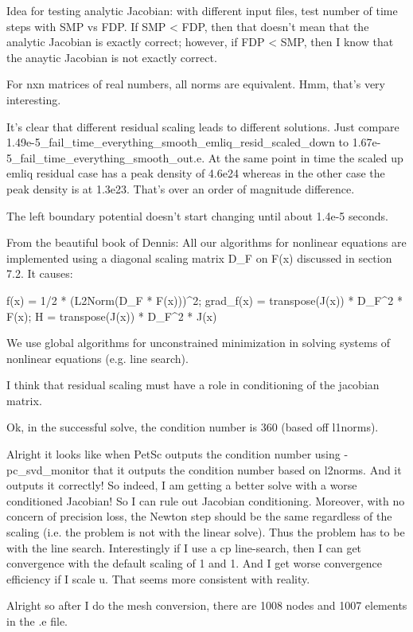 {Idea for testing analytic Jacobian: with different input files, test number of time steps with SMP vs FDP. If SMP < FDP, then that doesn't mean that the analytic Jacobian is exactly correct; however, if FDP < SMP, then I know that the anaytic Jacobian is not exactly correct.

For nxn matrices of real numbers, all norms are equivalent. Hmm, that's very interesting.

It's clear that different residual scaling leads to different solutions. Just compare 1.49e-5_fail_time_everything_smooth_emliq_resid_scaled_down to 1.67e-5_fail_time_everything_smooth_out.e. At the same point in time the scaled up emliq residual case has a peak density of 4.6e24 whereas in the other case the peak density is at 1.3e23. That's over an order of magnitude difference.

The left boundary potential doesn't start changing until about 1.4e-5 seconds.

From the beautiful book of Dennis: All our algorithms for nonlinear equations are implemented using a diagonal scaling matrix D_F on F(x) discussed in section 7.2. It causes:

f(x) = 1/2 * (L2Norm(D_F * F(x)))^2; grad_f(x) = transpose(J(x)) * D_F^2 * F(x); H = transpose(J(x)) * D_F^2 * J(x)

We use global algorithms for unconstrained minimization in solving systems of nonlinear equations (e.g. line search).

I think that residual scaling must have a role in conditioning of the jacobian matrix.

Ok, in the successful solve, the condition number is 360 (based off l1norms).

Alright it looks like when PetSc outputs the condition number using -pc_svd_monitor that it outputs the condition number based on l2norms. And it outputs it correctly! So indeed, I am getting a better solve with a worse conditioned Jacobian! So I can rule out Jacobian conditioning. Moreover, with no concern of precision loss, the Newton step should be the same regardless of the scaling (i.e. the problem is not with the linear solve). Thus the problem has to be with the line search. Interestingly if I use a cp line-search, then I can get convergence with the default scaling of 1 and 1. And I get worse convergence efficiency if I scale u. That seems more consistent with reality.

Alright so after I do the mesh conversion, there are 1008 nodes and 1007 elements in the .e file.

}
